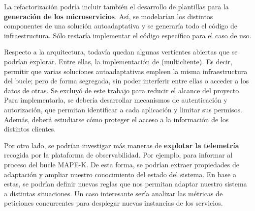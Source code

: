 La refactorización podría incluir también el desarrollo de plantillas para la \textbf{generación de los microservicios}. Así, se modelarían los distintos componentes de una solución autoadaptativa y se generaría todo el código de infraestructura. Sólo restaría implementar el código específico para el caso de uso.

Respecto a la arquitectura, todavía quedan algunas vertientes abiertas que se podrían explorar. Entre ellas, la implementación de \textbf{} (multicliente). \cite{aljahdaliMultitenancyCloudComputing2014} Es decir, permitir que varias soluciones autoadaptativas empleen la misma infraestructura del bucle; pero de forma segregada, sin poder interferir entre ellas o acceder a los datos de otras. Se excluyó de este trabajo para reducir el alcance del proyecto. Para implementarla, se debería desarrollar mecanismos de autenticación y autorización, que permitan identificar a cada aplicación y limitar sus permisos. Además, deberá estudiarse cómo proteger el acceso a la información de los distintos clientes.

Por otro lado, se podrían investigar más maneras de \textbf{explotar la telemetría} recogida por la plataforma de observabilidad. Por ejemplo, para informar al proceso del bucle MAPE-K. De esta forma, se podrían extraer propiedades de adaptación y ampliar nuestro conocimiento del estado del sistema. En base a estas, se podrían definir nuevas reglas que nos permitan adaptar nuestro sistema a distintas situaciones. Un caso interesante sería analizar las métricas de peticiones concurrentes para desplegar nuevas instancias de los servicios.
